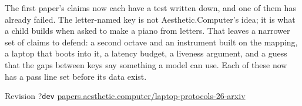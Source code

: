 \documentclass[10pt,letterpaper,twocolumn]{article}
\newcommand{\acdot}{{\color{acpink}.}}
\newcommand{\ac}{Aesthetic{\acdot}Computer}
\providecommand{\paperhash}{dev}\providecommand{\paperrev}{?}}
\begin{document}
The first paper's claims now each have a test written down, and one of them has already failed. The letter-named key is not \ac{}'s idea; it is what a child builds when asked to make a piano from letters. That leaves a narrower set of claims to defend: a second octave and an instrument built on the mapping, a laptop that boots into it, a latency budget, a liveness argument, and a guess that the gaps between keys say something a model can use. Each of these now has a pass line set before its data exist.


\balance
\setlength{\bibsep}{0pt}
{\footnotesize}

\vspace{0.8em}
\begin{center}
\footnotesize\sffamily\color{acgray}
Revision \paperrev\;\textperiodcentered\;\texttt{\paperhash}\;\textperiodcentered\;
\href{https://papers.aesthetic.computer/laptop-protocols-26-arxiv.pdf}{papers.aesthetic.computer/laptop-protocols-26-arxiv}
\end{center}
\end{document}
